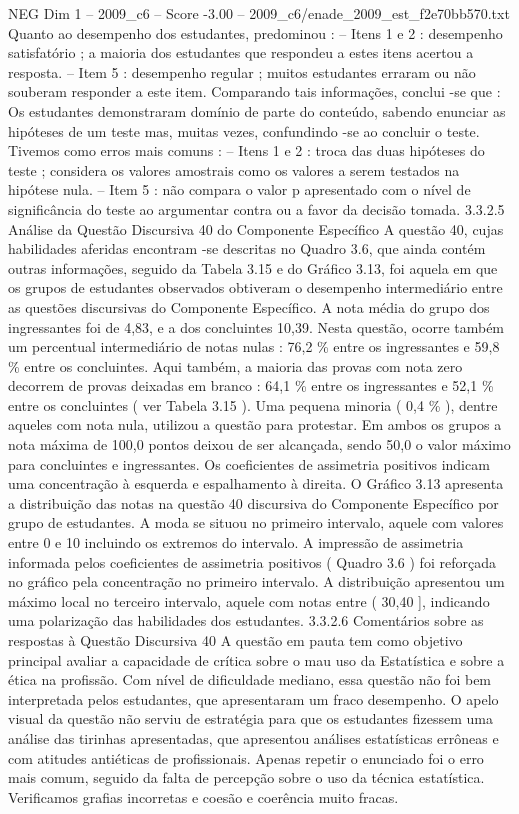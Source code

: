 \begin{textsample}{NEG Dim 1 – 2009\_c6 – Score -3.00 – 2009\_c6/enade\_2009\_est\_f2e70bb570.txt}
Quanto ao desempenho dos estudantes, predominou : – Itens 1 e 2 : desempenho satisfatório ; a maioria dos estudantes que respondeu a estes itens acertou a resposta. – Item 5 : desempenho regular ; muitos estudantes erraram ou não souberam responder a este item.
Comparando tais informações, conclui -se que : Os estudantes demonstraram domínio de parte do conteúdo, sabendo enunciar as hipóteses de um teste mas, muitas vezes, confundindo -se ao concluir o teste.
Tivemos como erros mais comuns : – Itens 1 e 2 : troca das duas hipóteses do teste ; considera os valores amostrais como os valores a serem testados na hipótese nula. – Item 5 : não compara o valor p apresentado com o nível de significância do teste ao argumentar contra ou a favor da decisão tomada. 3.3.2.5 Análise da Questão Discursiva 40 do Componente Específico A questão 40, cujas habilidades aferidas encontram -se descritas no Quadro 3.6, que ainda contém outras informações, seguido da Tabela 3.15 e do Gráfico 3.13, foi aquela em que os grupos de estudantes observados obtiveram o desempenho intermediário entre as questões discursivas do Componente Específico.
A nota média do grupo dos ingressantes foi de 4,83, e a dos concluintes 10,39.
Nesta questão, ocorre também um percentual intermediário de notas nulas : 76,2 \% entre os ingressantes e 59,8 \% entre os concluintes.
Aqui também, a maioria das provas com nota zero decorrem de provas deixadas em branco : 64,1 \% entre os ingressantes e 52,1 \% entre os concluintes ( ver Tabela 3.15 ).
Uma pequena minoria ( 0,4 \% ), dentre aqueles com nota nula, utilizou a questão para protestar.
Em ambos os grupos a nota máxima de 100,0 pontos deixou de ser alcançada, sendo 50,0 o valor máximo para concluintes e ingressantes.
Os coeficientes de assimetria positivos indicam uma concentração à esquerda e espalhamento à direita.
O Gráfico 3.13 apresenta a distribuição das notas na questão 40 discursiva do Componente Específico por grupo de estudantes.
A moda se situou no primeiro intervalo, aquele com valores entre 0 e 10 incluindo os extremos do intervalo.
A impressão de assimetria informada pelos coeficientes de assimetria positivos ( Quadro 3.6 ) foi reforçada no gráfico pela concentração no primeiro intervalo.
A distribuição apresentou um máximo local no terceiro intervalo, aquele com notas entre ( 30,40 ], indicando uma polarização das habilidades dos estudantes. 3.3.2.6 Comentários sobre as respostas à Questão Discursiva 40 A questão em pauta tem como objetivo principal avaliar a capacidade de crítica sobre o mau uso da Estatística e sobre a ética na profissão.
Com nível de dificuldade mediano, essa questão não foi bem interpretada pelos estudantes, que apresentaram um fraco desempenho.
O apelo visual da questão não serviu de estratégia para que os estudantes fizessem uma análise das tirinhas apresentadas, que apresentou análises estatísticas errôneas e com atitudes antiéticas de profissionais.
Apenas repetir o enunciado foi o erro mais comum, seguido da falta de percepção sobre o uso da técnica estatística.
Verificamos grafias incorretas e coesão e coerência muito fracas.

\end{textsample}
